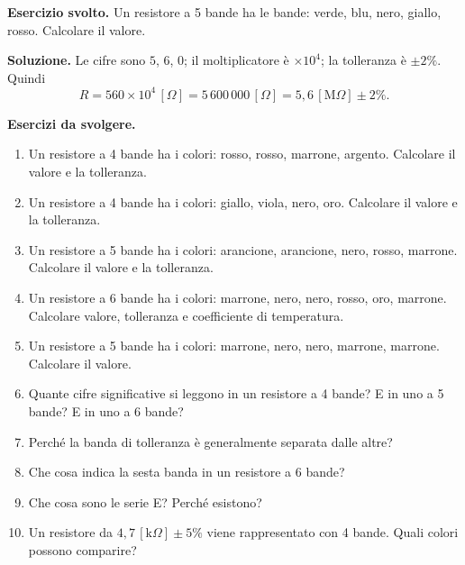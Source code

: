 \begin{esercizio}
\textbf{Esercizio svolto.} Un resistore a 5 bande ha le bande: verde, blu, nero, giallo, rosso. Calcolare il valore.

\smallskip
\textbf{Soluzione.} Le cifre sono \(5\), \(6\), \(0\); il moltiplicatore è \(\times 10^4\); la tolleranza è \(\pm 2\%\). Quindi
\[
R = 560 \times 10^4\,[\Omega] = 5\,600\,000\,[\Omega] = 5{,}6\,[\text{M}\Omega] \pm 2\%.
\]
\end{esercizio}

\textbf{Esercizi da svolgere.}

\begin{enumerate}[leftmargin=1cm]
  \item Un resistore a 4 bande ha i colori: rosso, rosso, marrone, argento. Calcolare il valore e la tolleranza.
  \item Un resistore a 4 bande ha i colori: giallo, viola, nero, oro. Calcolare il valore e la tolleranza.
  \item Un resistore a 5 bande ha i colori: arancione, arancione, nero, rosso, marrone. Calcolare il valore e la tolleranza.
  \item Un resistore a 6 bande ha i colori: marrone, nero, nero, rosso, oro, marrone. Calcolare valore, tolleranza e coefficiente di temperatura.
  \item Un resistore a 5 bande ha i colori: marrone, nero, nero, marrone, marrone. Calcolare il valore.
  \item Quante cifre significative si leggono in un resistore a 4 bande? E in uno a 5 bande? E in uno a 6 bande?
  \item Perché la banda di tolleranza è generalmente separata dalle altre?
  \item Che cosa indica la sesta banda in un resistore a 6 bande?
  \item Che cosa sono le serie E? Perché esistono?
  \item Un resistore da \(4{,}7\,[\text{k}\Omega] \pm 5\%\) viene rappresentato con 4 bande. Quali colori possono comparire?
\end{enumerate}
